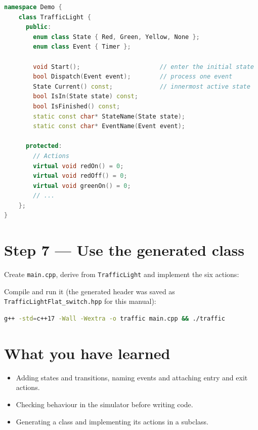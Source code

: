 \documentclass[11pt,a4paper,openany]{report}
\newcommand{\code}[1]{\texttt{#1}}
\begin{document}
\begin{lstlisting}[language=C++]
namespace Demo {
    class TrafficLight {
      public:
        enum class State { Red, Green, Yellow, None };
        enum class Event { Timer };

        void Start();                      // enter the initial state
        bool Dispatch(Event event);        // process one event
        State Current() const;             // innermost active state
        bool IsIn(State state) const;
        bool IsFinished() const;
        static const char* StateName(State state);
        static const char* EventName(Event event);

      protected:
        // Actions
        virtual void redOn() = 0;
        virtual void redOff() = 0;
        virtual void greenOn() = 0;
        // ...
    };
}
\end{lstlisting}

\section{Step 7 --- Use the generated class}
Create \code{main.cpp}, derive from \code{TrafficLight} and implement the six actions:



Compile and run it (the generated header was saved as \code{TrafficLightFlat\_switch.hpp} for this
manual):
\begin{lstlisting}[language=bash]
g++ -std=c++17 -Wall -Wextra -o traffic main.cpp && ./traffic
\end{lstlisting}



\section{What you have learned}
\begin{itemize}[itemsep=1pt]
  \item Adding states and transitions, naming events and attaching entry and exit actions.
  \item Checking behaviour in the simulator before writing code.
  \item Generating a class and implementing its actions in a subclass.
\end{itemize}

\end{document}
